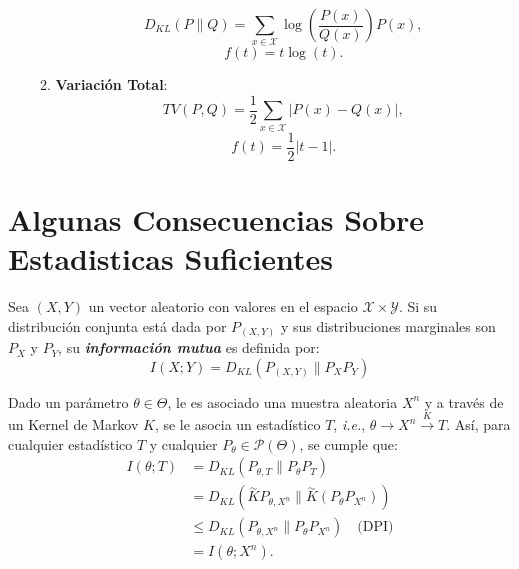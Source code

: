 \begin{itemize}
\begin{enumerate}[label=(\alph*)]
\begin{equation*}
                D_{KL}(P\|Q)=\sum_{x\in\mathcal{X}}\log\left(\frac{P(x)}{Q(x)}\right)P(x),
            \end{equation*}
            \begin{equation*}
                f(t)=t\log(t).
            \end{equation*}
            \item \textbf{Variaci\'on Total}:
            \begin{equation*}
                TV(P,Q)=\frac{1}{2}\sum_{x\in\mathcal{X}}|P(x)-Q(x)|,
            \end{equation*}
            \begin{equation*}
                f(t)=\frac{1}{2}|t-1|.
            \end{equation*}
    \end{enumerate}
\end{itemize}
\section{Algunas Consecuencias Sobre\\ Estadisticas Suficientes}
\begin{definition}
Sea $(X,Y)$ un vector aleatorio con valores en el espacio $\mathcal{X}\times\mathcal{Y}$. Si su distribuci\'on conjunta est\'a dada por $P_{(X,Y)}$ y sus distribuciones marginales son $P_X$ y $P_Y$, su \textit{\textbf{informaci\'on mutua}} es definida por:
\begin{equation*}
    I(X;Y)=D_{KL}(P_{(X,Y)}\|P_XP_Y)
\end{equation*}
\end{definition}
\begin{observation}
Dado un par\'ametro $\theta\in\Theta$, le es asociado una muestra aleatoria $
X^n$ y a trav\'es de un Kernel de Markov $K$, se le asocia un estad\'istico $T$, \textit{i.e.}, $\theta\to X^n\overset{K}{\to}T$. 
As\'i, para cualquier estad\'istico $T$ y cualquier $P_\theta\in\mathcal{P}(\Theta)$, se cumple que:
\begin{align*}
    I(\theta;T)&=D_{KL}(P_{\theta,T}\|P_\theta P_T)\\
    &=D_{KL}\left(\overset{\sim}{K}P_{\theta,X^n}\Big\|\overset{\sim}{K}(P_\theta P_{X^n})\right)\\
    &\leq D_{KL}(P_{\theta,X^n}\|P_\theta P_{X^n})\quad\text{(DPI)}\\
    &=I(\theta;X^n).
\end{align*}
\end{observation}

